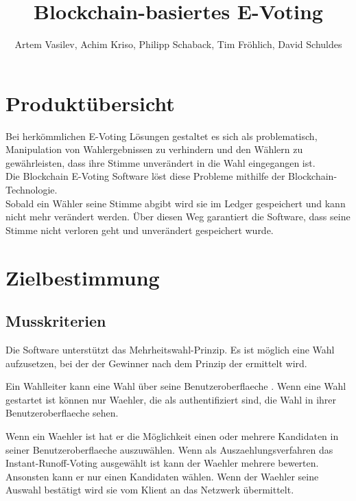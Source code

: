 \documentclass[parskip=full,11pt,twoside]{scrartcl}
\title{Blockchain-basiertes E-Voting}
\author{Artem Vasilev, Achim Kriso, Philipp Schaback, Tim Fröhlich, David Schuldes}
\begin{document}
\maketitle

\pagebreak

\tableofcontents
\pagebreak
\section{Produktübersicht}

Bei herkömmlichen E-Voting Lösungen gestaltet es sich als problematisch, Manipulation von Wahlergebnissen zu verhindern und den Wählern zu gewährleisten, dass ihre Stimme unverändert in die Wahl eingegangen ist. \\
Die Blockchain E-Voting Software löst diese Probleme mithilfe der Blockchain-Technologie. \\
Sobald ein Wähler seine Stimme abgibt wird sie im \gls{Ledger} gespeichert und kann nicht mehr verändert werden. Über diesen Weg garantiert die Software, dass seine Stimme nicht verloren geht und unverändert gespeichert wurde.

\section{Zielbestimmung}

\subsection{Musskriterien}

Die Software unterstützt das Mehrheitswahl-Prinzip. Es ist möglich eine Wahl aufzusetzen, bei der der Gewinner nach dem Prinzip der 
 ermittelt wird.

Ein \gls{Wahlleiter} kann eine \gls{Wahl} über seine \gls{Benutzeroberflaeche} .
Wenn eine \gls{Wahl} gestartet ist können nur \gls{Waehler}, die als  authentifiziert sind, die \gls{Wahl} in ihrer \gls{Benutzeroberflaeche} sehen.

Wenn ein \gls{Waehler}  ist hat er die Möglichkeit einen oder mehrere Kandidaten in seiner \gls{Benutzeroberflaeche} auszuwählen. Wenn als \gls{Auszaehlungsverfahren} das \gls{Instant-Runoff-Voting} ausgewählt ist kann der \gls{Waehler} mehrere  bewerten. Ansonsten kann er nur einen Kandidaten wählen.
Wenn der \gls{Waehler} seine Auswahl bestätigt wird sie vom \gls{Klient} an das Netzwerk übermittelt.
\end{document}
